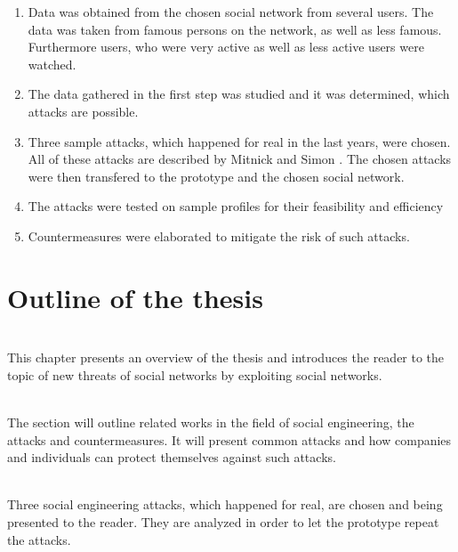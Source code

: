 \begin{enumerate}

\item Data was obtained from the chosen social network from several users. The
data was taken from famous persons on the network, as well as less famous.
Furthermore users, who were very active as well as less active users were
watched.

\item The data gathered in the first step was studied and it was determined,
which attacks are possible. 

\item Three sample attacks, which happened for real in the last years, were
chosen. All of these attacks are described by Mitnick and Simon
\cite{mitnick2003}. The chosen attacks were then transfered to the prototype
and the chosen social network.

\item The attacks were tested on sample profiles for their feasibility and
efficiency

\item Countermeasures were elaborated to mitigate the risk of such attacks.

\end{enumerate}

\newpage
\section{Outline of the thesis}

\let\oldchapterautorefname \chapterautorefname
\def\chapterautorefname{Chapter}

\vspace{0.5em}\\
\noindent This chapter presents an overview of the thesis and introduces the
reader to the topic of new threats of social networks by exploiting social
networks.

\vspace{0.5em}\\
\noindent The section will outline related works in the field of social
engineering, the attacks and countermeasures. It will present common attacks
and how companies and individuals can protect themselves against such attacks.

\vspace{0.5em}\\
\noindent Three social engineering attacks, which happened for real, are chosen
and being presented to the reader. They are analyzed in order to let the
prototype repeat the attacks.

